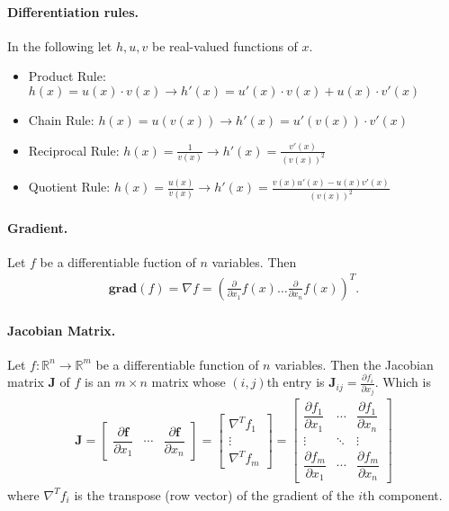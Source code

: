 \documentclass{article}
\begin{document}
\paragraph{Differentiation rules.} In the following let $h, u, v$ be real-valued functions of $x$.
\begin{itemize}
    \item Product Rule: $h(x) = u(x) \cdot v(x) \rightarrow h'(x) = u'(x) \cdot v(x) + u(x) \cdot v'(x)$
    \item Chain Rule: $h(x) = u(v(x)) \rightarrow  h'(x) = u'(v(x)) \cdot v'(x)$
    \item Reciprocal Rule: $h(x) = \frac{1}{v(x)} \rightarrow  h'(x) = \frac{v'(x)}{(v(x))^2}$
    \item Quotient Rule: $h(x) = \frac{u(x)}{v(x)} \rightarrow  h'(x) = \frac{v(x)u'(x) - u(x)v'(x)}{(v(x))^2}$
\end{itemize}

\paragraph{Gradient.} Let $f$ be a differentiable fuction of $n$ variables. Then
\begin{gather*}
    \mathbf{grad}(f) = \nabla f = \left( \frac{\partial}{\partial x_1} f(x) \dots \frac{\partial}{\partial x_n} f(x) \right)^T.
\end{gather*}

\paragraph{Jacobian Matrix.} Let $f: \mathbb{R}^{n} \rightarrow \mathbb{R}^{m}$ be a differentiable function of $n$ variables. Then the Jacobian matrix $\mathbf {J}$ of $f$ is an $m \times n$ matrix whose $(i,j)$th entry is ${\mathbf {J}_{ij}={\frac {\partial f_{i}}{\partial x_{j}}}}$. Which is 
\begin{gather*}
    {\mathbf {J} ={\begin{bmatrix}{\dfrac {\partial \mathbf {f} }{\partial x_{1}}}&\cdots &{\dfrac {\partial \mathbf {f} }{\partial x_{n}}}\end{bmatrix}}={\begin{bmatrix}\nabla ^{T}f_{1}\\\vdots \\\nabla ^{T}f_{m}\end{bmatrix}}={\begin{bmatrix}{\dfrac {\partial f_{1}}{\partial x_{1}}}&\cdots &{\dfrac {\partial f_{1}}{\partial x_{n}}}\\\vdots &\ddots &\vdots \\{\dfrac {\partial f_{m}}{\partial x_{1}}}&\cdots &{\dfrac {\partial f_{m}}{\partial x_{n}}}\end{bmatrix}}}
\end{gather*}
where ${\nabla ^{T}f_{i}}$ is the transpose (row vector) of the gradient of the $i$th component.
\end{document}
